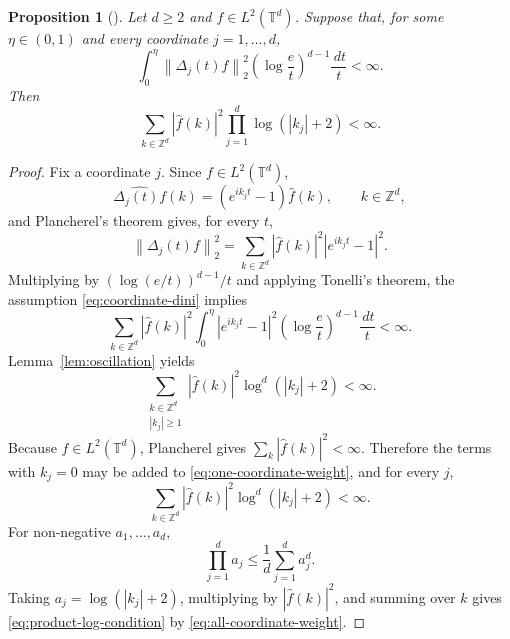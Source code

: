 \documentclass[10pt,a4paper]{amsart}
\newtheorem{proposition}{Proposition}
\newcommand{\T}{\mathbb T}
\newcommand{\Z}{\mathbb Z}
\newcommand{\abs}[1]{\left\lvert #1\right\rvert}
\newcommand{\dd}{\,d}
\newcommand{\norm}[1]{\left\lVert #1\right\rVert}
\newcommand{\wh}{\widehat}
\begin{document}
\begin{proposition}[]\label{prop:difference-to-product}
Let $d\ge2$ and $f\in L^2(\T^d)$. Suppose that, for some $\eta\in(0,1)$ and every coordinate $j=1,\ldots,d$,
\begin{equation}\label{eq:coordinate-dini}
 \int_0^\eta \norm{\Delta_j(t)f}_{2}^{2}\left(\log\frac et\right)^{d-1}\frac{\dd t}{t}<\infty .
\end{equation}
Then
\begin{equation}\label{eq:product-log-condition}
 \sum_{k\in\Z^d}\abs{\wh f(k)}^2\prod_{j=1}^d\log(\abs{k_j}+2)<\infty .
\end{equation}
\end{proposition}

\begin{proof}
Fix a coordinate $j$. Since $f\in L^2(\T^d)$,
\[
 \widehat{\Delta_j(t)f}(k)=(e^{ik_jt}-1)\wh f(k),\qquad k\in\Z^d,
\]
and Plancherel's theorem gives, for every $t$,
\[
 \norm{\Delta_j(t)f}_2^2
 =\sum_{k\in\Z^d}\abs{\wh f(k)}^2\abs{e^{ik_jt}-1}^2.
\]
Multiplying by $(\log(e/t))^{d-1}/t$ and applying Tonelli's theorem, the assumption \eqref{eq:coordinate-dini} implies
\begin{equation}\label{eq:tonelli-coordinate}
 \sum_{k\in\Z^d}\abs{\wh f(k)}^2
 \int_0^\eta \abs{e^{ik_jt}-1}^2\left(\log\frac et\right)^{d-1}\frac{\dd t}{t}<\infty .
\end{equation}
Lemma~\ref{lem:oscillation} yields
\begin{equation}\label{eq:one-coordinate-weight}
 \sum_{\substack{k\in\Z^d\\ \abs{k_j}\ge1}}\abs{\wh f(k)}^2\log^d(\abs{k_j}+2)<\infty .
\end{equation}
Because $f\in L^2(\T^d)$, Plancherel gives $\sum_k\abs{\wh f(k)}^2<\infty$. Therefore the terms with $k_j=0$ may be added to \eqref{eq:one-coordinate-weight}, and for every $j$,
\begin{equation}\label{eq:all-coordinate-weight}
 \sum_{k\in\Z^d}\abs{\wh f(k)}^2\log^d(\abs{k_j}+2)<\infty .
\end{equation}
For non-negative $a_1,\ldots,a_d$,
\[
 \prod_{j=1}^d a_j\le \frac1d\sum_{j=1}^d a_j^d.
\]
Taking $a_j=\log(\abs{k_j}+2)$, multiplying by $\abs{\wh f(k)}^2$, and summing over $k$ gives \eqref{eq:product-log-condition} by \eqref{eq:all-coordinate-weight}.
\end{proof}
\end{document}
